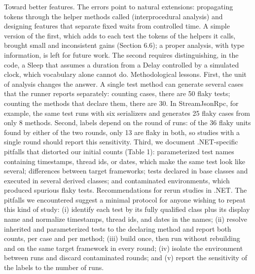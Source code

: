 Toward better features. The errors point to natural extensions: propagating tokens through the helper methods called (interprocedural analysis) and designing features that separate fixed waits from controlled time. A simple version of the first, which adds to each test the tokens of the helpers it calls, brought small and inconsistent gains (Section 6.6); a proper analysis, with type information, is left for future work. The second requires distinguishing, in the code, a Sleep that assumes a duration from a Delay controlled by a simulated clock, which vocabulary alone cannot do.
Methodological lessons. First, the unit of analysis changes the answer. A single test method can generate several cases that the runner reports separately: counting cases, there are 50 flaky tests; counting the methods that declare them, there are 30. In StreamJsonRpc, for example, the same test runs with six serializers and generates 25 flaky cases from only 8 methods. Second, labels depend on the round of runs: of the 36 flaky units found by either of the two rounds, only 13 are flaky in both, so studies with a single round should report this sensitivity. Third, we document .NET-specific pitfalls that distorted our initial counts (Table 1): parameterized test names containing timestamps, thread ids, or dates, which make the same test look like several; differences between target frameworks; tests declared in base classes and executed in several derived classes; and contaminated environments, which produced spurious flaky tests.
Recommendations for rerun studies in .NET. The pitfalls we encountered suggest a minimal protocol for anyone wishing to repeat this kind of study: (i) identify each test by its fully qualified class plus its display name and normalize timestamps, thread ids, and dates in the names; (ii) resolve inherited and parameterized tests to the declaring method and report both counts, per case and per method; (iii) build once, then run without rebuilding and on the same target framework in every round; (iv) isolate the environment between runs and discard contaminated rounds; and (v) report the sensitivity of the labels to the number of runs.